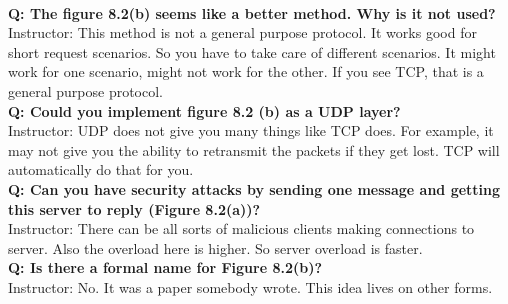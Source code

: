 \documentclass[twoside]{article}
\begin{document}
\begin{description}
\\\textbf{Q: The figure 8.2(b) seems like a better method. Why is it not used?}\\
{Instructor: This method is not a general purpose protocol. It works good for short request scenarios. So you have to take care of different scenarios. It might work for one scenario, might not work for the other. If you see TCP, that is a general purpose protocol.}
\\\textbf{Q: Could you implement figure 8.2 (b) as a UDP layer?}\\
{Instructor: UDP does not give you many things like TCP does. For example, it may not give you the ability to retransmit the packets if they get lost. TCP will automatically do that for you. }
\\\textbf{Q: Can you have security attacks by sending one message and getting this server to reply (Figure 8.2(a))?}\\
{Instructor:  There can be all sorts of malicious clients making connections to server. Also the overload here is higher. So server overload is faster.}
\\\textbf{Q: Is there a formal name for Figure 8.2(b)?}\\
{Instructor: No. It was a paper somebody wrote. This idea lives on other forms.}
\end{description}
\end{document}

